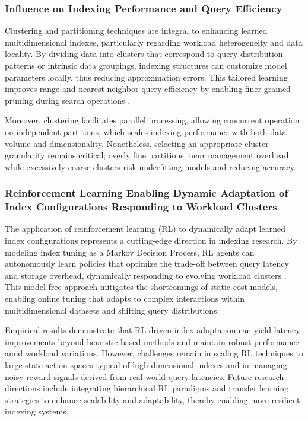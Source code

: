 \documentclass[11pt]{article}
\begin{document}
\subsubsection{Influence on Indexing Performance and Query Efficiency}

Clustering and partitioning techniques are integral to enhancing learned multidimensional indexes, particularly regarding workload heterogeneity and data locality. By dividing data into clusters that correspond to query distribution patterns or intrinsic data groupings, indexing structures can customize model parameters locally, thus reducing approximation errors. This tailored learning improves range and nearest neighbor query efficiency by enabling finer-grained pruning during search operations \cite{ref34}.

Moreover, clustering facilitates parallel processing, allowing concurrent operation on independent partitions, which scales indexing performance with both data volume and dimensionality. Nonetheless, selecting an appropriate cluster granularity remains critical; overly fine partitions incur management overhead while excessively coarse clusters risk underfitting models and reducing accuracy.

\subsubsection{Reinforcement Learning Enabling Dynamic Adaptation of Index Configurations Responding to Workload Clusters}

The application of reinforcement learning (RL) to dynamically adapt learned index configurations represents a cutting-edge direction in indexing research. By modeling index tuning as a Markov Decision Process, RL agents can autonomously learn policies that optimize the trade-off between query latency and storage overhead, dynamically responding to evolving workload clusters \cite{ref33}. This model-free approach mitigates the shortcomings of static cost models, enabling online tuning that adapts to complex interactions within multidimensional datasets and shifting query distributions.

Empirical results demonstrate that RL-driven index adaptation can yield latency improvements beyond heuristic-based methods and maintain robust performance amid workload variations. However, challenges remain in scaling RL techniques to large state-action spaces typical of high-dimensional indexes and in managing noisy reward signals derived from real-world query latencies. Future research directions include integrating hierarchical RL paradigms and transfer learning strategies to enhance scalability and adaptability, thereby enabling more resilient indexing systems.
\end{document}
